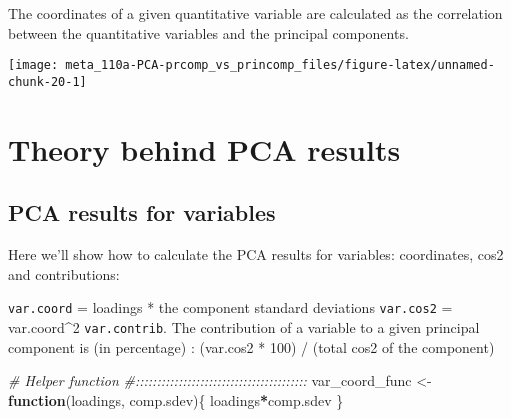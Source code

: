 \documentclass[]{book}
\newenvironment{Shaded}{\begin{snugshade}}{\end{snugshade}}
\newcommand{\CommentTok}[1]{\textcolor[rgb]{0.56,0.35,0.01}{\textit{#1}}}
\newcommand{\ControlFlowTok}[1]{\textcolor[rgb]{0.13,0.29,0.53}{\textbf{#1}}}
\newcommand{\DataTypeTok}[1]{\textcolor[rgb]{0.13,0.29,0.53}{#1}}
\newcommand{\DecValTok}[1]{\textcolor[rgb]{0.00,0.00,0.81}{#1}}
\newcommand{\KeywordTok}[1]{\textcolor[rgb]{0.13,0.29,0.53}{\textbf{#1}}}
\newcommand{\NormalTok}[1]{#1}
\newcommand{\OperatorTok}[1]{\textcolor[rgb]{0.81,0.36,0.00}{\textbf{#1}}}
\newcommand{\StringTok}[1]{\textcolor[rgb]{0.31,0.60,0.02}{#1}}
\begin{document}
The coordinates of a given quantitative variable are calculated as the correlation between the quantitative variables and the principal components.

\begin{Shaded}
\end{Shaded}

\begin{center}\texttt{[image: meta\_110a-PCA-prcomp\_vs\_princomp\_files/figure-latex/unnamed-chunk-20-1]} \end{center}

\hypertarget{theory-behind-pca-results}{%
\section{Theory behind PCA results}\label{theory-behind-pca-results}}

\hypertarget{pca-results-for-variables}{%
\subsection{PCA results for variables}\label{pca-results-for-variables}}

Here we'll show how to calculate the PCA results for variables: coordinates, cos2 and contributions:

\texttt{var.coord} = loadings * the component standard deviations
\texttt{var.cos2} = var.coord\^{}2
\texttt{var.contrib}. The contribution of a variable to a given principal component is (in percentage) : (var.cos2 * 100) / (total cos2 of the component)

\begin{Shaded}
\begin{Highlighting}[]
\CommentTok{# Helper function }
\CommentTok{#::::::::::::::::::::::::::::::::::::::::}
\NormalTok{var_coord_func <-}\StringTok{ }\ControlFlowTok{function}\NormalTok{(loadings, comp.sdev)\{}
\NormalTok{  loadings}\OperatorTok{*}\NormalTok{comp.sdev}
\NormalTok{\}}
\end{Highlighting}
\end{Shaded}
\end{document}
